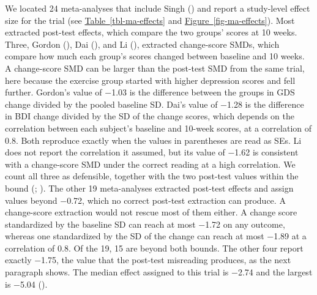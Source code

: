 \documentclass[
  letterpaper,
  DIV=11,
  numbers=noendperiod]{scrartcl}
\begin{document}
We located 24 meta-analyses that include Singh
() and report a study-level effect size
for the trial (see
\hyperref[tbl-ma-effects]{Table~\ref*{tbl-ma-effects}} and
\hyperref[fig-ma-effects]{Figure~\ref*{fig-ma-effects}}). Most extracted
post-test effects, which compare the two groups' scores at 10 weeks.
Three, Gordon (), Dai
(), and Li (),
extracted change-score SMDs, which compare how much each group's scores
changed between baseline and 10 weeks. A change-score SMD can be larger
than the post-test SMD from the same trial, here because the exercise
group started with higher depression scores and fell further. Gordon's
value of −1.03 is the difference between the groups in GDS change
divided by the pooled baseline SD. Dai's value of −1.28 is the
difference in BDI change divided by the SD of the change scores, which
depends on the correlation between each subject's baseline and 10-week
scores, at a correlation of 0.8. Both reproduce exactly when the values
in parentheses are read as SEs. Li does not report the correlation it
assumed, but its value of −1.62 is consistent with a change-score SMD
under the correct reading at a high correlation. We count all three as
defensible, together with the two post-test values within the bound
(; ). The other 19 meta-analyses extracted post-test effects and
assign values beyond −0.72, which no correct post-test extraction can
produce. A change-score extraction would not rescue most of them either.
A change score standardized by the baseline SD can reach at most −1.72
on any outcome, whereas one standardized by the SD of the change can
reach at most −1.89 at a correlation of 0.8. Of the 19, 15 are beyond
both bounds. The other four report exactly −1.75, the value that the
post-test misreading produces, as the next paragraph shows. The median
effect assigned to this trial is −2.74 and the largest is −5.04
().
\end{document}
